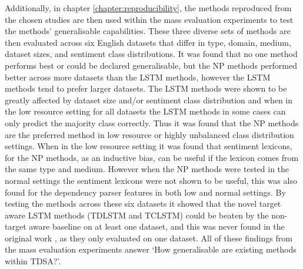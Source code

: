 Additionally, in chapter \ref{chapter:reproducibility}, the methods reproduced from the chosen studies are then used within the mass evaluation experiments to test the methods' generalisable capabilities. These three diverse sets of methods are then evaluated across six English datasets that differ in type, domain, medium, dataset sizes, and sentiment class distributions. It was found that no one method performs best or could be declared generalisable, but the NP methods performed better across more datasets than the LSTM methods, however the LSTM methods tend to prefer larger datasets. The LSTM methods were shown to be greatly affected by dataset size and/or sentiment class distribution and when in the low resource setting for all datasets the LSTM methods in some cases can only predict the majority class correctly. Thus it was found that the NP methods are the preferred method in low resource or highly unbalanced class distribution settings. When in the low resource setting it was found that sentiment lexicons, for the NP methods, as an inductive bias, can be useful if the lexicon comes from the same type and medium. However when the NP methods were tested in the normal settings the sentiment lexicons were not shown to be useful, this was also found for the dependency parser features in both low and normal settings. By testing the methods across these six datasets it showed that the novel target aware LSTM methods (TDLSTM and TCLSTM) could be beaten by the non-target aware baseline on at least one dataset, and this was never found in the original work \citep{tang-etal-2016-effective}, as they only evaluated on one dataset. All of these findings from the mass evaluation experiments answer  `How generalisable are existing methods within TDSA?'.

